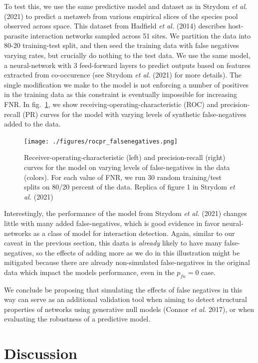 \documentclass[11pt]{article}
\begin{document}
To test this, we use the same predictive model and dataset as in Strydom
\emph{et al.} (2021) to predict a metaweb from various empirical slices
of the species pool observed across space. This dataset from Hadfield
\emph{et al.} (2014) describes host-parasite interaction networks
sampled across 51 sites. We partition the data into 80-20 training-test
split, and then seed the training data with false negatives varying
rates, but crucially do nothing to the test data. We use the same model,
a neural-network with 3 feed-forward layers to predict outputs based on
features extracted from co-occurence (see Strydom \emph{et al.} (2021)
for more details). The single modification we make to the model is not
enforcing a number of positives in the training data as this constraint
is eventually impossible for increasing FNR. In fig.~\ref{fig:rocpr}, we
show receiving-operating-characteristic (ROC) and precision-recall (PR)
curves for the model with varying levels of synthetic false-negatives
added to the data.

\begin{figure}
\hypertarget{fig:rocpr}{%
\centering
\texttt{[image: ./figures/rocpr\_falsenegatives.png]}
\caption{Receiver-operating-characteristic (left) and precision-recall
(right) curves for the model on varying levels of false-negatives in the
data (colors). For each value of FNR, we run 30 random training/test
splits on 80/20 percent of the data. Replica of figure 1 in Strydom
\emph{et al.} (2021)}\label{fig:rocpr}
}
\end{figure}

Interestingly, the performance of the model from Strydom \emph{et al.}
(2021) changes little with many added false-negatives, which is good
evidence in favor neural-networks as a class of model for interaction
detection. Again, similar to our caveat in the previous section, this
dazta is \emph{already} likely to have many false-negatives, so the
effects of adding more as we do in this illustration might be mitigated
because there are already non-simulated false-negatives in the original
data which impact the models performance, even in the \(p_{fn} = 0\)
case.

We conclude be proposing that simulating the effects of false negatives
in this way can serve as an additional validation tool when aiming to
detect structural properties of networks using generative null models
(Connor \emph{et al.} 2017), or when evaluating the robustness of a
predictive model.

\hypertarget{discussion}{%
\section{Discussion}\label{discussion}}
\end{document}
